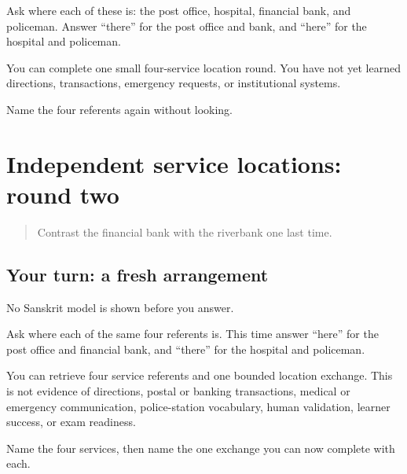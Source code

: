 Ask where each of these is: the post office, hospital, financial bank, and policeman. Answer “there” for the post office and bank, and “here” for the hospital and policeman.

\begin{grammarlens}[title={What you've built: boundary}]
You can complete one small four-service location round. You have not yet learned directions, transactions, emergency requests, or institutional systems.
\end{grammarlens}

\begin{tcolorbox}[breakable,colback=teal!4,colframe=teal!35!black,title={Before you move on}]
Name the four referents again without looking.
\end{tcolorbox}
\section[(independent service locations, second …]{Independent service locations: round two}

\label{lesson:SA-C268-service-location-retrieval}



\begin{quote}
Contrast the financial bank with the riverbank one last time.
\end{quote}

\subsection*{Your turn: a fresh arrangement}
No Sanskrit model is shown before you answer.

Ask where each of the same four referents is. This time answer “here” for the post office and financial bank, and “there” for the hospital and policeman.

\begin{grammarlens}[title={What you've built: boundary}]
You can retrieve four service referents and one bounded location exchange. This is not evidence of directions, postal or banking transactions, medical or emergency communication, police-station vocabulary, human validation, learner success, or exam readiness.
\end{grammarlens}

\begin{tcolorbox}[breakable,colback=teal!4,colframe=teal!35!black,title={Before you move on}]
Name the four services, then name the one exchange you can now complete with each.
\end{tcolorbox}
